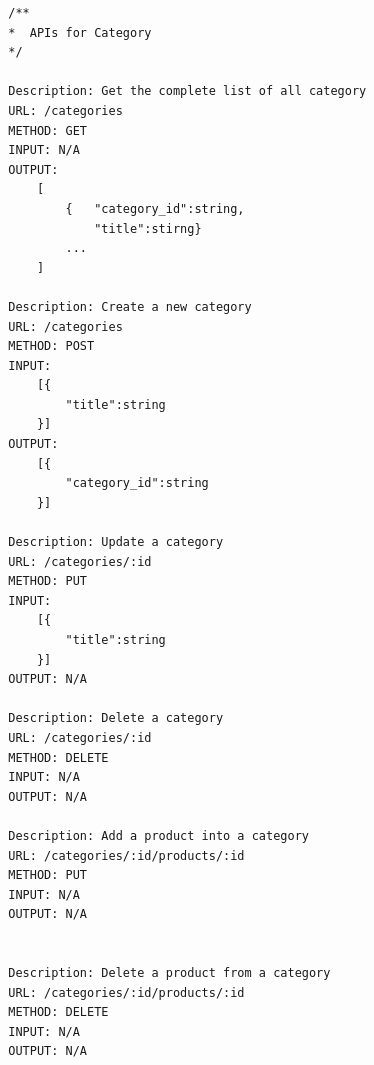 \documentclass[12pt]{article}
\begin{document}
\begin{verbatim}
        /**
        *  APIs for Category
        */

        Description: Get the complete list of all category
        URL: /categories
        METHOD: GET
        INPUT: N/A
        OUTPUT: 
            [
                {   "category_id":string,
                    "title":stirng}
                ...
            ]

        Description: Create a new category
        URL: /categories
        METHOD: POST
        INPUT: 
            [{
                "title":string
            }]
        OUTPUT: 
            [{
                "category_id":string
            }]

        Description: Update a category
        URL: /categories/:id
        METHOD: PUT
        INPUT: 
            [{
                "title":string
            }]
        OUTPUT: N/A

        Description: Delete a category
        URL: /categories/:id
        METHOD: DELETE
        INPUT: N/A
        OUTPUT: N/A

        Description: Add a product into a category
        URL: /categories/:id/products/:id
        METHOD: PUT
        INPUT: N/A
        OUTPUT: N/A


        Description: Delete a product from a category
        URL: /categories/:id/products/:id
        METHOD: DELETE
        INPUT: N/A
        OUTPUT: N/A
        
    \end{verbatim}
\end{document}
